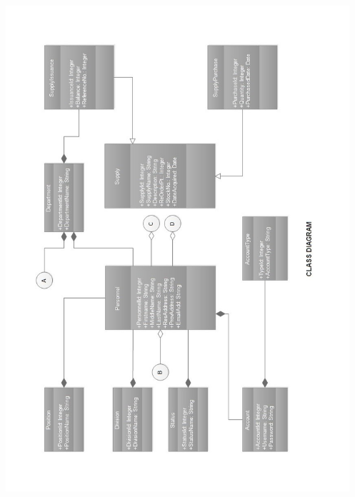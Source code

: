 \begin{center}
	\includegraphics[width=14cm,height=18cm]{image/f2.jpg}
\end{center}
\vfill

\newpage

